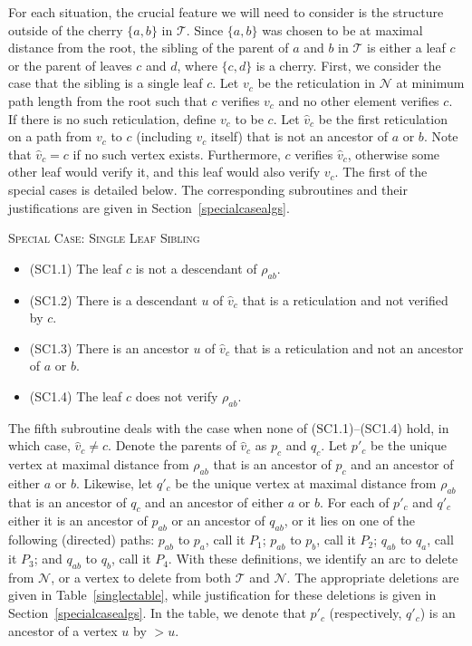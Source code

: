 \documentclass[11pt]{amsart}
\begin{document}
For each situation, the crucial feature we will need to consider is the structure outside of the cherry $\{a, b\}$ in ${{\mathcal T}}$. Since $\{a, b\}$ was chosen to be at maximal distance from the root, the sibling of the parent of $a$ and $b$ in ${{\mathcal T}}$ is either a leaf $c$ or the parent of leaves $c$ and $d$, where $\{c, d\}$ is a cherry.
First, we consider the case that the sibling is a single leaf $c$. Let $v_c$ be the reticulation in ${{\mathcal N}}$ at minimum path length from the root such that $c$ verifies $v_c$ and no other element verifies $c$. If there is no such reticulation, define $v_c$ to be $c$.  Let $\hat v_c$ be the first reticulation on a path from $v_c$ to $c$ (including $v_c$ itself) that is not an ancestor of $a$ or $b$. Note that $\hat v_c=c$ if no such vertex exists. Furthermore, $c$ verifies $\hat v_c$, otherwise some other leaf would verify it, and this leaf would also verify $v_c$. The first of the special cases is detailed below. The corresponding subroutines and their justifications are given in Section~\ref{specialcasealgs}.

\noindent\textsc{Special Case: Single Leaf Sibling}
\begin {itemize}
\item[(SC1.1)] The leaf $c$ is not a descendant of $\rho_{ab}$.

\item[(SC1.2)] There is a descendant $u$ of $\hat v_c$ that is a reticulation and not verified by $c$.

\item[(SC1.3)] There is an ancestor $u$ of $\hat v_c$ that is a reticulation and not an ancestor of $a$ or $b$.

\item[(SC1.4)] The leaf $c$ does not verify $\rho_{ab}$.
\end{itemize}

The fifth subroutine deals with the case when none of (SC1.1)--(SC1.4) hold, in which case, $\hat{v}_c\neq c$. Denote the parents of $\hat v_c$ as $p_c$ and $q_c$. Let $p'_c$ be the unique  vertex at maximal distance from $\rho_{ab}$ that is an ancestor of $p_c$ and an ancestor of either $a$ or $b$. Likewise, let $q'_c$ be the unique vertex at maximal distance from $\rho_{ab}$ that is an ancestor of $q_c$ and an ancestor of either $a$ or $b$. For each of $p'_c$ and $q'_c$ either it is an ancestor of $p_{ab}$ or an ancestor of $q_{ab}$, or it lies on one of the following (directed) paths: $p_{ab}$ to $p_a$, call it $P_1$; $p_{ab}$ to $p_b$, call it $P_2$; $q_{ab}$ to $q_a$, call it $P_3$;  and $q_{ab}$ to $q_b$, call it $P_4$. With these definitions, we identify an arc to delete from ${{\mathcal N}}$, or a vertex to delete from both ${{\mathcal T}}$ and ${{\mathcal N}}$. The appropriate deletions are given in Table~\ref{singlectable}, while justification for these deletions is given in Section~\ref{specialcasealgs}. In the table, we denote that $p'_c$ (respectively, $q'_c$) is an ancestor of a vertex $u$ by $>u$.
\end{document}
